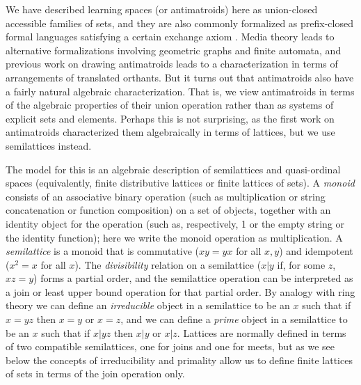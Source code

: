 \documentclass[11pt]{llncs}
\begin{document}
{We have described learning spaces (or antimatroids) here as union-closed accessible families of sets, and they are also commonly formalized as prefix-closed formal languages satisfying a certain exchange axiom \citep{KorLovSch-91}. Media theory \citep{falma02,eppst07b} leads to alternative formalizations involving geometric graphs and finite automata, and previous work on drawing antimatroids \citep{eppst06} leads to a characterization in terms of arrangements of translated orthants. But it turns out that antimatroids also have a fairly natural algebraic characterization. That is, we view antimatroids in terms of the algebraic properties of their union operation rather than as systems of explicit sets and elements. Perhaps this is not surprising, as the first work on antimatroids \citep{dilworth40} characterized them algebraically in terms of lattices, but we use semilattices instead.

The model for this is an algebraic description of semilattices and quasi-ordinal spaces (equivalently, finite distributive lattices or finite lattices of sets). A \emph{monoid} consists of an associative binary operation (such as multiplication or string concatenation or function composition) on a set of objects, together with an identity object for the operation (such as, respectively, 1 or the empty string or the identity function); here we write the monoid operation as multiplication. A \emph{semilattice} is a monoid that is commutative ($xy=yx$ for all $x,y$) and idempotent ($x^2=x$ for all $x$). The \emph{divisibility} relation on a semilattice ($x|y$ if, for some $z$, $xz=y$) forms a partial order, and the semilattice operation can be interpreted as a join or least upper bound operation for that partial order. By analogy with ring theory we can define an \emph{irreducible} object in a semilattice to be an $x$ such that if $x=yz$ then $x=y$ or $x=z$, and we can define a \emph{prime} object in a semilattice to be an $x$ such that if $x|yz$ then $x|y$ or $x|z$. Lattices are normally defined in terms of two compatible semilattices, one for joins and one for meets, but as we see below the concepts of irreducibility and primality allow us to define finite lattices of sets in terms of the join operation only.

}
\end{document}
